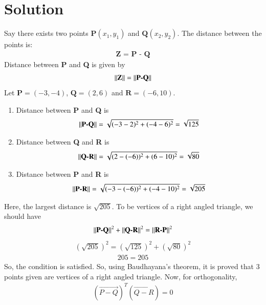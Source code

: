 \documentclass[journal,12pt,twocolumn]{IEEEtran}
\begin{document}
\section{Solution}
Say there exists two points $\textbf{P}(x_1, y_1)$ and $\textbf{Q}(x_2, y_2)$. The distance between the points is:
\begin{align}
    \textbf{Z = P - Q}
\end{align}
Distance between \textbf{P} and \textbf{Q} is given by 
\begin{align}
||\textbf{Z}|| = \left\lVert\textbf{P-Q}\right\rVert
\end{align}
Let $\textbf{P} = (-3, -4)$, $\textbf{Q} = (2, 6)$ and $\textbf{R} = (-6, 10)$.
\begin{enumerate}
    \item Distance between \textbf{P} and \textbf{Q} is 
\begin{align}
\left\lVert\textbf{P-Q}\right\rVert = \sqrt{(-3-2)^2+(-4-6)^2}
=\sqrt{125}
\end{align}
\item Distance between \textbf{Q} and \textbf{R} is 
\begin{align}
\left\lVert\textbf{Q-R}\right\rVert = \sqrt{(2-(-6))^2+(6-10)^2}
=\sqrt{80}
\end{align}
\item Distance between \textbf{P} and \textbf{R} is 
\begin{align}
\left\lVert\textbf{P-R}\right\rVert = \sqrt{(-3-(-6))^2+(-4-10)^2}
=\sqrt{205}
\end{align}
\end{enumerate}
Here, the largest distance is $\sqrt{205}$. To be vertices of a right angled triangle, we should have 
\begin{align}
  \left\lVert\textbf{P-Q}\right\rVert^2 + \left\lVert\textbf{Q-R}\right\rVert^2 = \left\lVert\textbf{R-P}\right\rVert^2
\end{align}
\begin{align}
  (\sqrt{205})^2 = (\sqrt{125})^2 + (\sqrt{80})^2
\end{align}
\begin{align}
  205 = 205
\end{align}
So, the condition is satisfied. 
So, using Baudhayana's theorem, it is proved that 3 points given are vertices of a right angled triangle. 
Now, for orthogonality, 
\begin{align}
    (\vec{P-Q})^T(\vec{Q-R}) = 0
\end{align}
\end{document}
